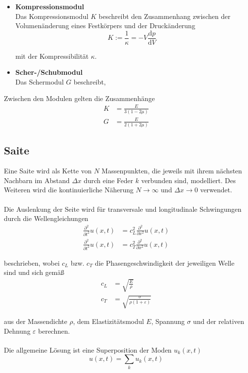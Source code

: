 \documentclass{article}
\newcommand{\diff}{\mathrm{d}}
\begin{document}
\begin{itemize}
	\item \textbf{Kompressionsmodul}\\ %
	Das Kompressionsmodul $K$ beschreibt den Zusammenhang zwischen der Volumenänderung eines Festkörpers und der Druckänderung
		\begin{equation}
			K := \frac{1}{\kappa} = -V \frac{\diff p}{\diff V}
		\end{equation}

	mit der Kompressibilität $\kappa$.


	\item \textbf{Scher-/Schubmodul}\\ %
	Das Schermodul $G$ beschreibt, 




\end{itemize}

Zwischen den Modulen gelten die Zusammenhänge
	\begin{align}
		K &= \frac{E}{3(1 - 2\mu)} \\
		G &= \frac{E}{2(1 + 2\mu)}
	\end{align}


\newpage


\subsection{Saite}
Eine Saite wird als Kette von $N$ Massenpunkten, die jeweils mit ihrem nächsten Nachbarn im Abstand $\Delta x$ durch eine Feder $k$ verbunden sind, modelliert. Des Weiteren wird die kontinuierliche Näherung $N\to\infty$ und $\Delta x\to 0$ verwendet.\\
\\
Die Auslenkung der Seite wird für transversale und longitudinale Schwingungen durch die Wellengleichungen
	\begin{align}
		\frac{\partial^2}{\partial t^2} u(x,t) &= c_L^2 \frac{\partial^2}{\partial x^2} u(x,t) \\
		\frac{\partial^2}{\partial t^2} u(x,t) &= c_T^2 \frac{\partial^2}{\partial x^2} u(x,t)		
	\end{align}

beschrieben, wobei $c_L$ bzw. $c_T$ die Phasengeschwindigkeit der jeweiligen Welle sind und sich gemäß
	\begin{align*}
		c_L &= \sqrt{\frac{E}{\rho}} \\
		c_T &= \sqrt{\frac{\sigma}{\rho(1+\varepsilon)}}
	\end{align*}

aus der Massendichte $\rho$, dem Elastizitätsmodul $E$, Spannung $\sigma$ und der relativen Dehnung $\varepsilon$ berechnen.\\
\\
Die allgemeine Lösung ist eine Superposition der Moden $u_k(x,t)$
	\begin{equation}
		u(x,t) = \sum_k u_k(x,t)
	\end{equation}
\end{document}
